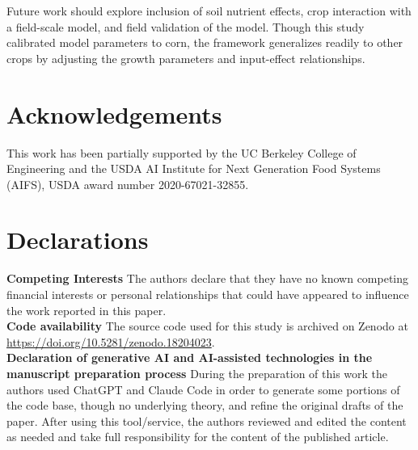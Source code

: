 \documentclass[preprint,12pt]{elsarticle}
\begin{document}
Future work should explore inclusion of soil nutrient effects, crop interaction with a field-scale model, and field validation of the model. Though this study calibrated model parameters to corn, the framework generalizes readily to other crops by adjusting the growth parameters and input-effect relationships.

\pagebreak
\section{Acknowledgements}

This work has been partially supported by the UC Berkeley College of Engineering and the USDA AI Institute for Next Generation Food Systems (AIFS), USDA award number 2020-67021-32855.

\section*{Declarations}

\noindent\textbf{Competing Interests}
\noindent The authors declare that they have no known competing financial interests or personal relationships that could have appeared to influence the work reported in this paper. \\

\noindent\textbf{Code availability}
\noindent The source code used for this study is archived on Zenodo at \url{https://doi.org/10.5281/zenodo.18204023}. \\

\noindent\textbf{Declaration of generative AI and AI-assisted technologies in the manuscript preparation process}
\noindent During the preparation of this work the authors used ChatGPT and Claude Code in order to generate some portions of the code base, though no underlying theory, and refine the original drafts of the paper. After using this tool/service, the authors reviewed and edited the content as needed and take full responsibility for the content of the published article.

\pagebreak
\appendix
\end{document}
